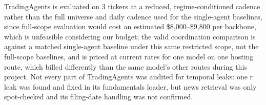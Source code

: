 \documentclass{article}
\begin{document}
TradingAgents is evaluated on 3 tickers at a reduced, regime-conditioned cadence rather than the full universe and daily cadence used for the single-agent baselines, since full-scope evaluation would cost an estimated \$8{,}000--\$9{,}800 per backbone, which is unfeasible considering our budget; the valid coordination comparison is against a matched single-agent baseline under this same restricted scope, not the full-scope baselines, and is priced at current rates for one model on one hosting route, which billed differently than the same model's other routes during this project. Not every part of TradingAgents was audited for temporal leaks: one r leak was found and fixed in its fundamentals loader, but news retrieval was only spot-checked and its filing-date handling was not confirmed.

\begin{ack}
\end{ack}
\end{document}
